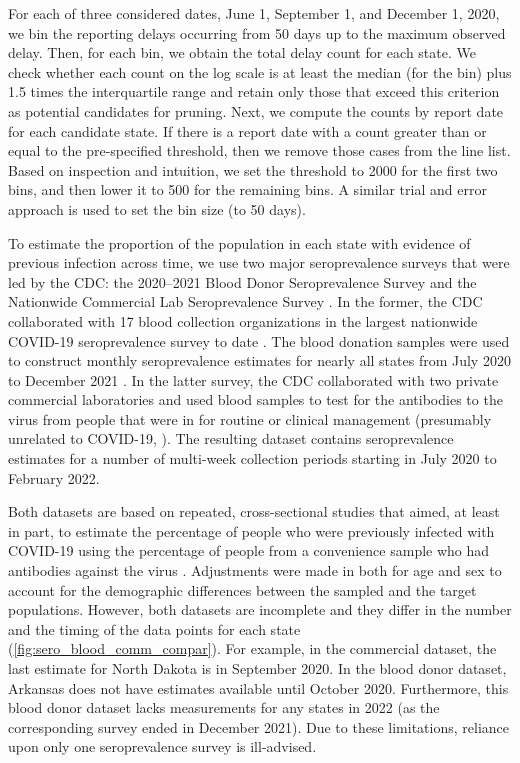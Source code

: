 \documentclass{article}
\begin{document}
For each of three considered dates, June 1, September 1, and
December 1, 2020, we bin the reporting delays occurring
from 50 days up to the maximum observed delay. Then, for each bin, we obtain
the total delay count for each state. We check whether each count on the
log scale is at least the median (for the bin) plus 1.5 times the
interquartile range and retain only those that exceed this criterion as potential
candidates for pruning. Next, we compute the counts by report date for each
candidate state. If there is a report date with a count greater than or equal to
the pre-specified threshold, then we remove those cases from the line list.
Based on inspection and intuition, we set the threshold to 2000 for the
first two bins, and then lower it to 500 for the remaining bins. 
A similar trial and error approach is used to set the bin size (to 50 days). %

To estimate the proportion of the population in each state with evidence of
previous infection across time, we use two major seroprevalence surveys that
were led by the CDC: the 2020--2021 Blood Donor Seroprevalence Survey and the
Nationwide Commercial Lab Seroprevalence Survey \citep{cdc2021blood,
cdc2021comm}. In the former, the CDC collaborated with 17 blood collection
organizations in the largest nationwide COVID-19 seroprevalence survey to date
\citep{cdc2021blood}. The blood donation samples were used to construct monthly
seroprevalence estimates for nearly all states from July 2020 to December 2021
\citep{jones2021estimated}. In the latter survey, the CDC collaborated with two
private commercial laboratories and used blood samples to test for the
antibodies to the virus from people that were in for routine or clinical
management (presumably unrelated to COVID-19, \citealp{bajema2021estimated}). The
resulting dataset contains seroprevalence estimates for a number of multi-week
collection periods starting in July 2020 to February 2022. 

Both datasets are based on repeated, cross-sectional studies that aimed, at
least in part, to estimate the percentage of people who were previously infected
with COVID-19 using the percentage of people from a convenience sample who had
antibodies against the virus \citep{bajema2021estimated, cdc2020data,
jones2021estimated}. Adjustments were made in both for age and sex to account
for the demographic differences between the sampled and the target populations.
However, both datasets are incomplete and they differ in the number and the
timing of the data points for each state (\autoref{fig:sero_blood_comm_compar}).
For example, in the commercial dataset, the last estimate for North Dakota is in
September 2020. In the blood donor dataset, Arkansas does not have estimates
available until October 2020. Furthermore, this blood donor dataset lacks
measurements for any states in 2022 (as the corresponding survey ended in
December 2021). Due to these limitations, reliance upon only one seroprevalence
survey is ill-advised. 
\end{document}
